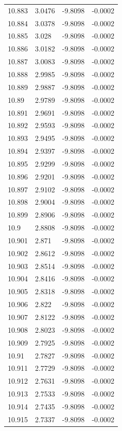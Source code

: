 \begin{tabular}{llll}
10.883 & 3.0476 & -9.8098 & -0.0002 \\
10.884 & 3.0378 & -9.8098 & -0.0002 \\
10.885 & 3.028 & -9.8098 & -0.0002 \\
10.886 & 3.0182 & -9.8098 & -0.0002 \\
10.887 & 3.0083 & -9.8098 & -0.0002 \\
10.888 & 2.9985 & -9.8098 & -0.0002 \\
10.889 & 2.9887 & -9.8098 & -0.0002 \\
10.89 & 2.9789 & -9.8098 & -0.0002 \\
10.891 & 2.9691 & -9.8098 & -0.0002 \\
10.892 & 2.9593 & -9.8098 & -0.0002 \\
10.893 & 2.9495 & -9.8098 & -0.0002 \\
10.894 & 2.9397 & -9.8098 & -0.0002 \\
10.895 & 2.9299 & -9.8098 & -0.0002 \\
10.896 & 2.9201 & -9.8098 & -0.0002 \\
10.897 & 2.9102 & -9.8098 & -0.0002 \\
10.898 & 2.9004 & -9.8098 & -0.0002 \\
10.899 & 2.8906 & -9.8098 & -0.0002 \\
10.9 & 2.8808 & -9.8098 & -0.0002 \\
10.901 & 2.871 & -9.8098 & -0.0002 \\
10.902 & 2.8612 & -9.8098 & -0.0002 \\
10.903 & 2.8514 & -9.8098 & -0.0002 \\
10.904 & 2.8416 & -9.8098 & -0.0002 \\
10.905 & 2.8318 & -9.8098 & -0.0002 \\
10.906 & 2.822 & -9.8098 & -0.0002 \\
10.907 & 2.8122 & -9.8098 & -0.0002 \\
10.908 & 2.8023 & -9.8098 & -0.0002 \\
10.909 & 2.7925 & -9.8098 & -0.0002 \\
10.91 & 2.7827 & -9.8098 & -0.0002 \\
10.911 & 2.7729 & -9.8098 & -0.0002 \\
10.912 & 2.7631 & -9.8098 & -0.0002 \\
10.913 & 2.7533 & -9.8098 & -0.0002 \\
10.914 & 2.7435 & -9.8098 & -0.0002 \\
10.915 & 2.7337 & -9.8098 & -0.0002 \\

\end{tabular}
